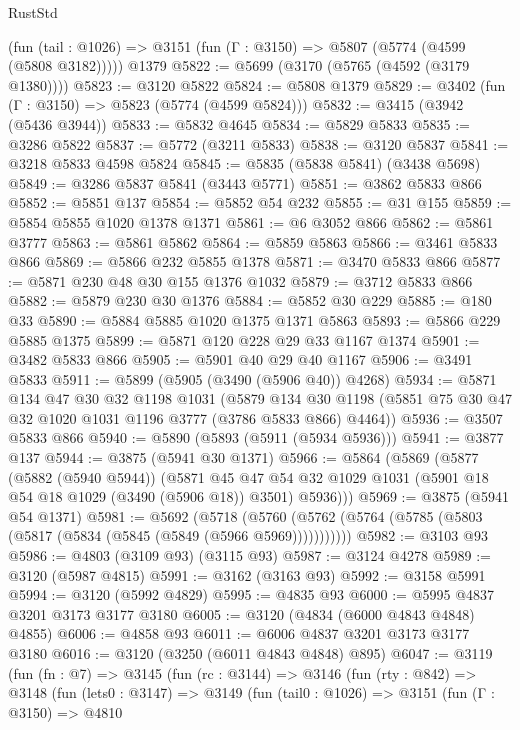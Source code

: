 \begin{lexlean}{RustStd}
\begin{coremodule}
    (fun (tail : @1026) => @3151 (fun (Γ : @3150) => @5807 (@5774 (@4599 (@5808 @3182)))))
    @1379
@5822 := @5699 (@3170 (@5765 (@4592 (@3179 @1380))))
@5823 := @3120 @5822
@5824 := @5808 @1379
@5829 := @3402 (fun (Γ : @3150) => @5823 (@5774 (@4599 @5824)))
@5832 := @3415 (@3942 (@5436 @3944))
@5833 := @5832 @4645
@5834 := @5829 @5833
@5835 := @3286 @5822
@5837 := @5772 (@3211 @5833)
@5838 := @3120 @5837
@5841 := @3218 @5833 @4598 @5824
@5845 := @5835 (@5838 @5841) (@3438 @5698)
@5849 := @3286 @5837 @5841 (@3443 @5771)
@5851 := @3862 @5833 @866
@5852 := @5851 @137
@5854 := @5852 @54 @232
@5855 := @31 @155
@5859 := @5854 @5855 @1020 @1378 @1371
@5861 := @6 @3052 @866
@5862 := @5861 @3777
@5863 := @5861 @5862
@5864 := @5859 @5863
@5866 := @3461 @5833 @866
@5869 := @5866 @232 @5855 @1378
@5871 := @3470 @5833 @866
@5877 := @5871 @230 @48 @30 @155 @1376 @1032
@5879 := @3712 @5833 @866
@5882 := @5879 @230 @30 @1376
@5884 := @5852 @30 @229
@5885 := @180 @33
@5890 := @5884 @5885 @1020 @1375 @1371 @5863
@5893 := @5866 @229 @5885 @1375
@5899 := @5871 @120 @228 @29 @33 @1167 @1374
@5901 := @3482 @5833 @866
@5905 := @5901 @40 @29 @40 @1167
@5906 := @3491 @5833
@5911 := @5899 (@5905 (@3490 (@5906 @40)) @4268)
@5934 := @5871
    @134
    @47
    @30
    @32
    @1198
    @1031
    (@5879 @134 @30 @1198 (@5851 @75 @30 @47 @32 @1020 @1031 @1196 @3777 (@3786 @5833 @866) @4464))
@5936 := @3507 @5833 @866
@5940 := @5890 (@5893 (@5911 (@5934 @5936)))
@5941 := @3877 @137
@5944 := @3875 (@5941 @30 @1371)
@5966 := @5864
    (@5869
      (@5877
        (@5882 (@5940 @5944))
        (@5871
          @45
          @47
          @54
          @32
          @1029
          @1031
          (@5901 @18 @54 @18 @1029 (@3490 (@5906 @18)) @3501)
          @5936)))
@5969 := @3875 (@5941 @54 @1371)
@5981 := @5692
    (@5718 (@5760 (@5762 (@5764 (@5785 (@5803 (@5817 (@5834 (@5845 (@5849 (@5966 @5969)))))))))))
@5982 := @3103 @93
@5986 := @4803 (@3109 @93) (@3115 @93)
@5987 := @3124 @4278
@5989 := @3120 (@5987 @4815)
@5991 := @3162 (@3163 @93)
@5992 := @3158 @5991
@5994 := @3120 (@5992 @4829)
@5995 := @4835 @93
@6000 := @5995 @4837 @3201 @3173 @3177 @3180
@6005 := @3120 (@4834 (@6000 @4843 @4848) @4855)
@6006 := @4858 @93
@6011 := @6006 @4837 @3201 @3173 @3177 @3180
@6016 := @3120 (@3250 (@6011 @4843 @4848) @895)
@6047 := @3119
    (fun (fn : @7) =>
    @3145
      (fun (rc : @3144) =>
      @3146
        (fun (rty : @842) =>
        @3148
          (fun (lets0 : @3147) =>
          @3149
            (fun (tail0 : @1026) =>
            @3151
              (fun (Γ : @3150) =>
              @4810

\end{coremodule}
\end{lexlean}
